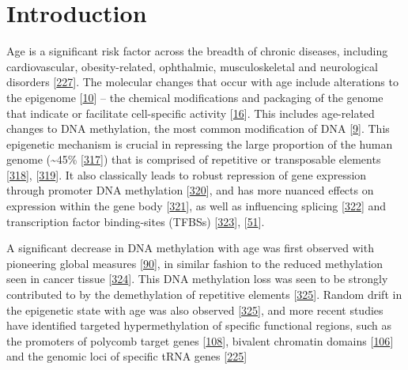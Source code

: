 \documentclass[
]{book}
\begin{document}
\hypertarget{AluIntro}{%
\section{Introduction}\label{AluIntro}}

Age is a significant risk factor across the breadth of chronic diseases, including cardiovascular, obesity-related, ophthalmic, musculoskeletal and neurological disorders {[}\protect\hyperlink{ref-Partridge2018}{227}{]}.
The molecular changes that occur with age include alterations to the epigenome {[}\protect\hyperlink{ref-Booth2016}{10}{]} -- the chemical modifications and packaging of the genome that indicate or facilitate cell-specific activity {[}\protect\hyperlink{ref-Bird2007}{16}{]}.
This includes age-related changes to DNA methylation, the most common modification of DNA {[}\protect\hyperlink{ref-Lopez-Otin2013}{9}{]}.
This epigenetic mechanism is crucial in repressing the large proportion of the human genome (\textasciitilde45\% {[}\protect\hyperlink{ref-Gregory2005}{317}{]}) that is comprised of repetitive or transposable elements {[}\protect\hyperlink{ref-Deniz2019}{318}{]}, {[}\protect\hyperlink{ref-Kazazian2017}{319}{]}.
It also classically leads to robust repression of gene expression through promoter DNA methylation {[}\protect\hyperlink{ref-Deaton2011}{320}{]}, and has more nuanced effects on expression within the gene body {[}\protect\hyperlink{ref-Hellman2007}{321}{]}, as well as influencing splicing {[}\protect\hyperlink{ref-Shukla2011}{322}{]} and transcription factor binding-sites (TFBSs) {[}\protect\hyperlink{ref-Blattler2014}{323}{]}, {[}\protect\hyperlink{ref-Yin2017}{51}{]}.

A significant decrease in DNA methylation with age was first observed with pioneering global measures {[}\protect\hyperlink{ref-Wilson1983}{90}{]}, in similar fashion to the reduced methylation seen in cancer tissue {[}\protect\hyperlink{ref-Gama-Sosa1983}{324}{]}.
This DNA methylation loss was seen to be strongly contributed to by the demethylation of repetitive elements {[}\protect\hyperlink{ref-Bollati2010}{325}{]}.
Random drift in the epigenetic state with age was also observed {[}\protect\hyperlink{ref-Bollati2010}{325}{]}, and more recent studies have identified targeted hypermethylation of specific functional regions, such as the promoters of polycomb target genes {[}\protect\hyperlink{ref-Teschendorff2010}{108}{]}, bivalent chromatin domains {[}\protect\hyperlink{ref-Rakyan2010}{106}{]} and the genomic loci of specific tRNA genes {[}\protect\hyperlink{ref-Acton2020}{225}{]}
\end{document}
